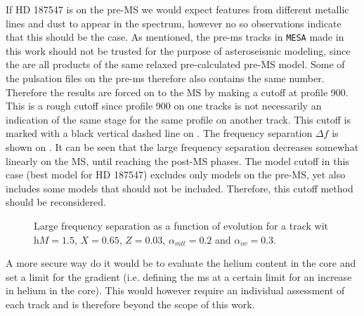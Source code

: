 If HD 187547 is on the pre-MS we would expect features from different metallic lines and dust to appear in the spectrum, however no so observations indicate that this should be the case. As mentioned, the pre-ms tracks in \texttt{MESA} made in this work should not be trusted for  the purpose of asteroseismic modeling, since the are all products of the same relaxed pre-calculated pre-MS model. Some of the pulsation files on the pre-ms therefore also contains the same number. Therefore the results are forced on to the MS by making a cutoff at profile 900. This is a rough cutoff since profile 900 on one tracks is not necessarily an indication of the same stage for the same profile on another track. This cutoff is marked with a black vertical dashed line on . The frequency separation $\Delta f$ is shown on . It can be seen that the large frequency separation decreases somewhat linearly on the MS, until reaching the post-MS phases. The model cutoff in this case (best model for HD 187547) excludes only models on the pre-MS, yet also includes some models that should not be included. Therefore, this cutoff method should be reconsidered. 

\begin{figure}[htbp]
	\centering
	\caption{Large frequency separation as a function of evolution for a track wit h$M=1.5$\msun, $X=0.65$, $Z=0.03$, $\alpha_{mlt}=0.2$ and $\alpha_{ov}=0.3$.}
	\label{plotfreqsastime}
\end{figure}

 A more secure way do it would be to evaluate the helium content in the core and set a limit for the gradient (i.e. defining the ms at a certain limit for an increase in helium in the core). This would however require an individual assessment of each track and is therefore beyond the scope of this work. 

